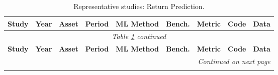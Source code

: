 \begin{longtable}{p{2.4cm} p{0.6cm} p{1.0cm} p{1.0cm} p{2.0cm} p{1.5cm} p{1.3cm} p{0.7cm} p{1.3cm}}
\caption{Representative studies: Return Prediction.}\label{tab:master_returns} \\
\toprule
\textbf{Study} & \textbf{Year} & \textbf{Asset} & \textbf{Period} & \textbf{ML Method} & \textbf{Bench.} & \textbf{Metric} & \textbf{Code} & \textbf{Data} \\
\midrule
\endfirsthead
\multicolumn{9}{c}{\textit{Table \ref{tab:master_returns} continued}} \\
\toprule
\textbf{Study} & \textbf{Year} & \textbf{Asset} & \textbf{Period} & \textbf{ML Method} & \textbf{Bench.} & \textbf{Metric} & \textbf{Code} & \textbf{Data} \\
\midrule
\endhead
\midrule
\multicolumn{9}{r}{\textit{Continued on next page}} \\
\endfoot
\bottomrule
\endlastfoot


\end{longtable}
